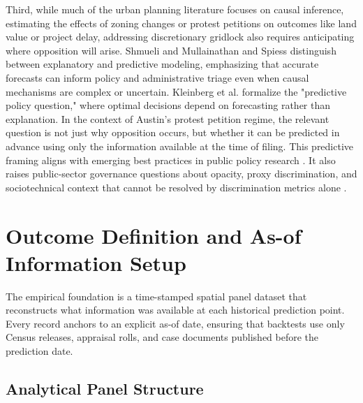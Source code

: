 \documentclass[11pt, letterpaper]{article}
\begin{document}
Third, while much of the urban planning literature focuses on causal inference, estimating the effects of zoning changes or protest petitions on outcomes like land value or project delay, addressing discretionary gridlock also requires anticipating where opposition will arise. Shmueli \cite{shmueli2010} and Mullainathan and Spiess \cite{mullainathan2017ml} distinguish between explanatory and predictive modeling, emphasizing that accurate forecasts can inform policy and administrative triage even when causal mechanisms are complex or uncertain. Kleinberg et al. \cite{kleinberg2015prediction} formalize the "predictive policy question," where optimal decisions depend on forecasting rather than explanation. In the context of Austin's protest petition regime, the relevant question is not just why opposition occurs, but whether it can be predicted in advance using only the information available at the time of filing. This predictive framing aligns with emerging best practices in public policy research \cite{athey2019ml}. It also raises public-sector governance questions about opacity, proxy discrimination, and sociotechnical context that cannot be resolved by discrimination metrics alone \cite{eubanks2018,oneil2016weapons,barocas2016,selbst2019fairness}.

\section{Outcome Definition and As-of Information Setup}

The empirical foundation is a time-stamped spatial panel dataset that reconstructs what information was available at each historical prediction point. Every record anchors to an explicit as-of date, ensuring that backtests use only Census releases, appraisal rolls, and case documents published before the prediction date.

\subsection{Analytical Panel Structure}
\end{document}
